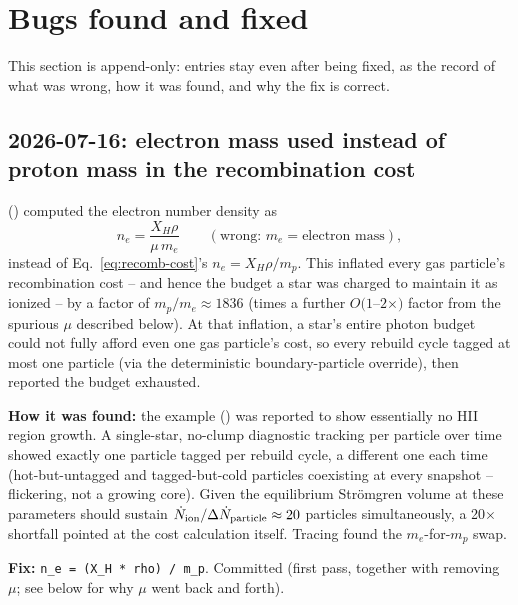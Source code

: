 \section{Bugs found and fixed}
\label{sec:bugs}

This section is append-only: entries stay even after being fixed, as
the record of what was wrong, how it was found, and why the fix is
correct.

\subsection{2026-07-16: electron mass used instead of proton mass in the recombination cost}
\label{sec:mass-bug}

() computed the electron number
density as
\begin{equation}
  n_e = \frac{X_H \rho}{\mu\, m_e} \qquad (\text{wrong: } m_e = \text{electron mass}),
\end{equation}
instead of Eq.~\ref{eq:recomb-cost}'s $n_e = X_H\rho/m_p$. This
inflated every gas particle's recombination cost -- and hence the
budget a star was charged to maintain it as ionized -- by a factor of
$m_p/m_e \approx 1836$ (times a further $O(1$--$2\times)$ factor from
the spurious $\mu$ described below). At that inflation, a star's
entire photon budget could not fully afford even one gas particle's
cost, so every rebuild cycle tagged at most one particle (via the
deterministic boundary-particle override), then reported the budget
exhausted.

\textbf{How it was found:} the example
() was reported to show
essentially no HII region growth. A single-star, no-clump diagnostic
tracking  per particle over time showed exactly
one particle tagged per rebuild cycle, a different one each time
(hot-but-untagged and tagged-but-cold particles coexisting at every
snapshot -- flickering, not a growing core). Given the equilibrium
Str\"omgren volume at these parameters should sustain
$\dot N_{\rm ion}/\Delta\dot N_{\rm particle} \approx 20$ particles
simultaneously, a 20$\times$ shortfall pointed at the cost calculation
itself. Tracing 
found the $m_e$-for-$m_p$ swap.

\textbf{Fix:} \texttt{n\_e = (X\_H * rho) / m\_p}. Committed
 (first pass, together with removing $\mu$; see
below for why $\mu$ went back and forth).

